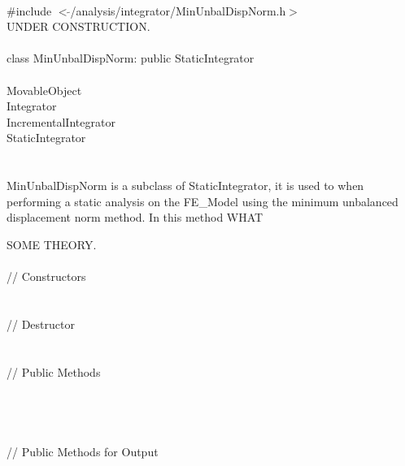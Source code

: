 
   \\
\indent \#include $<\tilde{ }$/analysis/integrator/MinUnbalDispNorm.h$>$  \\

UNDER CONSTRUCTION.\\

  \\
\indent class MinUnbalDispNorm: public StaticIntegrator  \\

 \\
\indent MovableObject \\
\indent\indent Integrator \\
\indent\indent\indent IncrementalIntegrator \\
\indent\indent\indent\indent StaticIntegrator \\
\indent\indent\indent\indent{} \\

 \\ 
\indent MinUnbalDispNorm is a subclass of StaticIntegrator, it is
used to when performing a static analysis on the FE\_Model using the
minimum unbalanced displacement norm method. In this method WHAT

SOME THEORY.\\

 \\
\indent // Constructors \\
\\ \\
\indent // Destructor \\
\\  \\
\indent // Public Methods \\
 \\
 \\
 \\ \\
\indent // Public Methods for Output\\
\\ 
\\ 
\\

